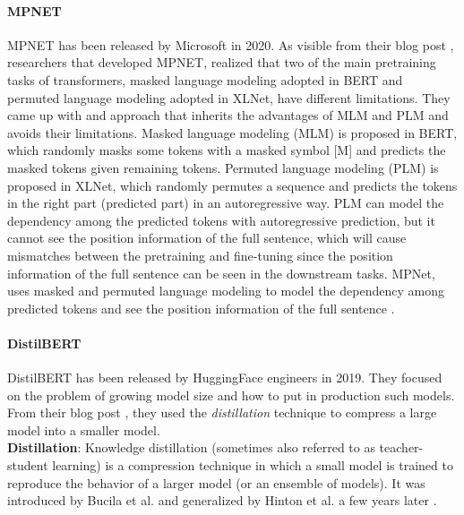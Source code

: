 \documentclass[\main/main.tex]{subfiles}
\begin{document}
\paragraph{MPNET}
MPNET has been released by Microsoft in 2020. As visible from their blog post \cite{mpnet_blog_post},  researchers that developed MPNET, realized that two of the main pretraining tasks of transformers, masked language modeling adopted in BERT and permuted language modeling adopted in XLNet, have different limitations. They came up with and approach that inherits the advantages of MLM and PLM and avoids their limitations. Masked language modeling (MLM) is proposed in BERT, which randomly masks some tokens with a masked symbol [M] and predicts the masked tokens given remaining tokens. Permuted language modeling (PLM) is proposed in XLNet, which randomly permutes a sequence and predicts the tokens in the right part (predicted part) in an autoregressive way. PLM can model the dependency among the predicted tokens with autoregressive prediction, but it cannot see the position information of the full sentence, which will cause mismatches between the pretraining and fine-tuning since the position information of the full sentence can be seen in the downstream tasks. MPNet, uses masked and permuted language modeling to model the dependency among predicted tokens and see the position information of the full sentence \cite{DBLP:journals/corr/abs-2004-09297}.
\paragraph{DistilBERT}
DistilBERT has been released by HuggingFace engineers in 2019. They focused on the problem of growing model size and how to put in production such models. From their blog post \cite{distilbert_blog_post}, they used the \emph{distillation} technique to compress a large model into a smaller model.\\
\textbf{Distillation}: Knowledge distillation (sometimes also referred to as teacher-student learning) is a compression technique in which a small model is trained to reproduce the behavior of a larger model (or an ensemble of models). It was introduced by Bucila et al. \cite{10.1145/1150402.1150464} and generalized by Hinton et al. \cite{hinton2015distilling} a few years later \cite{DBLP:journals/corr/abs-1910-01108}.
\end{document}
